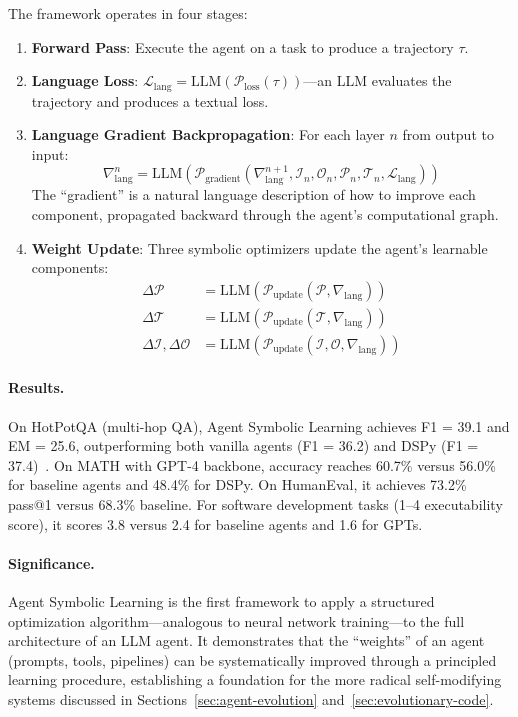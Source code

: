 The framework operates in four stages:

\begin{enumerate}
    \item \textbf{Forward Pass}: Execute the agent on a task to produce a trajectory $\tau$.
    \item \textbf{Language Loss}: $\mathcal{L}_{\text{lang}} = \text{LLM}(\mathcal{P}_{\text{loss}}(\tau))$---an LLM evaluates the trajectory and produces a textual loss.
    \item \textbf{Language Gradient Backpropagation}: For each layer $n$ from output to input:
    \begin{equation}
        \nabla_{\text{lang}}^n = \text{LLM}(\mathcal{P}_{\text{gradient}}(\nabla_{\text{lang}}^{n+1}, \mathcal{I}_n, \mathcal{O}_n, \mathcal{P}_n, \mathcal{T}_n, \mathcal{L}_{\text{lang}}))
    \end{equation}
    The ``gradient'' is a natural language description of how to improve each component, propagated backward through the agent's computational graph.
    \item \textbf{Weight Update}: Three symbolic optimizers update the agent's learnable components:
    \begin{align}
        \Delta\mathcal{P} &= \text{LLM}(\mathcal{P}_{\text{update}}(\mathcal{P}, \nabla_{\text{lang}})) \\
        \Delta\mathcal{T} &= \text{LLM}(\mathcal{P}_{\text{update}}(\mathcal{T}, \nabla_{\text{lang}})) \\
        \Delta\mathcal{I}, \Delta\mathcal{O} &= \text{LLM}(\mathcal{P}_{\text{update}}(\mathcal{I}, \mathcal{O}, \nabla_{\text{lang}}))
    \end{align}
\end{enumerate}

\paragraph{Results.}
On HotPotQA (multi-hop QA), Agent Symbolic Learning achieves F1 = 39.1 and EM = 25.6, outperforming both vanilla agents (F1 = 36.2) and DSPy (F1 = 37.4)~\citep{zhou2024symbolic}. On MATH with GPT-4 backbone, accuracy reaches 60.7\% versus 56.0\% for baseline agents and 48.4\% for DSPy. On HumanEval, it achieves 73.2\% pass@1 versus 68.3\% baseline. For software development tasks (1--4 executability score), it scores 3.8 versus 2.4 for baseline agents and 1.6 for GPTs.

\paragraph{Significance.}
Agent Symbolic Learning is the first framework to apply a structured optimization algorithm---analogous to neural network training---to the full architecture of an LLM agent. It demonstrates that the ``weights'' of an agent (prompts, tools, pipelines) can be systematically improved through a principled learning procedure, establishing a foundation for the more radical self-modifying systems discussed in Sections~\ref{sec:agent-evolution} and~\ref{sec:evolutionary-code}.

